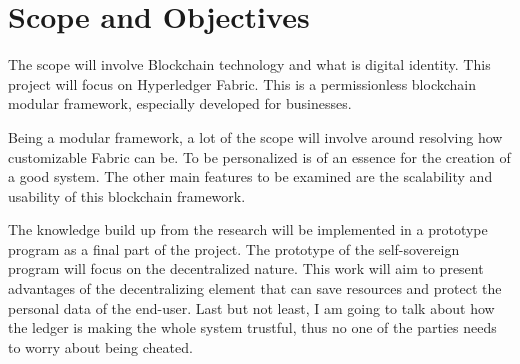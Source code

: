 \documentclass[a4paper,11pt]{report}
\begin{document}
\section{Scope and Objectives}

\label{introduction-objectives}

The scope will involve Blockchain technology and what is digital identity. This project will focus on Hyperledger Fabric. This is a permissionless blockchain modular framework, especially developed for businesses.
 
Being a modular framework, a lot of the scope will involve around resolving how customizable Fabric can be. To be personalized is of an essence for the creation of a good system. The other main features to be examined are the scalability and usability of this blockchain framework.   

The knowledge build up from the research will be implemented in a prototype program as a final part of the project. The prototype of the self-sovereign program will focus on the decentralized nature. This work will aim to present advantages of the decentralizing element that can save resources and protect the personal data of the end-user. Last but not least, I am going to talk about how the ledger is making the whole system trustful, thus no one of the parties needs to worry about being cheated. 
 	
\end{document}
